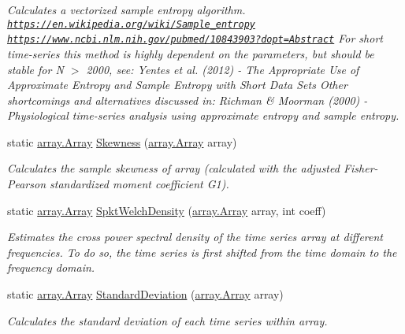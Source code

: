 \begin{DoxyCompactItemize}
\begin{DoxyCompactList}\small\item\em Calculates a vectorized sample entropy algorithm. \href{https://en.wikipedia.org/wiki/Sample_entropy}{\tt https\+://en.\+wikipedia.\+org/wiki/\+Sample\+\_\+entropy} \href{https://www.ncbi.nlm.nih.gov/pubmed/10843903?dopt=Abstract}{\tt https\+://www.\+ncbi.\+nlm.\+nih.\+gov/pubmed/10843903?dopt=\+Abstract} For short time-\/series this method is highly dependent on the parameters, but should be stable for N $>$ 2000, see\+: Yentes et al. (2012) -\/ The Appropriate Use of Approximate Entropy and Sample Entropy with Short Data Sets Other shortcomings and alternatives discussed in\+: Richman \& Moorman (2000) -\/ Physiological time-\/series analysis using approximate entropy and sample entropy. \end{DoxyCompactList}\item 
static \mbox{\hyperlink{classkhiva_1_1array_1_1_array}{array.\+Array}} \mbox{\hyperlink{classkhiva_1_1features_1_1_features_a31ad18b51c0f5016e87fbd4e6e61be4f}{Skewness}} (\mbox{\hyperlink{classkhiva_1_1array_1_1_array}{array.\+Array}} array)
\begin{DoxyCompactList}\small\item\em Calculates the sample skewness of array (calculated with the adjusted Fisher-\/\+Pearson standardized moment coefficient G1). \end{DoxyCompactList}\item 
static \mbox{\hyperlink{classkhiva_1_1array_1_1_array}{array.\+Array}} \mbox{\hyperlink{classkhiva_1_1features_1_1_features_a96814e8fb33d72bd2ba7cb552bcf4d02}{Spkt\+Welch\+Density}} (\mbox{\hyperlink{classkhiva_1_1array_1_1_array}{array.\+Array}} array, int coeff)
\begin{DoxyCompactList}\small\item\em Estimates the cross power spectral density of the time series array at different frequencies. To do so, the time series is first shifted from the time domain to the frequency domain. \end{DoxyCompactList}\item 
static \mbox{\hyperlink{classkhiva_1_1array_1_1_array}{array.\+Array}} \mbox{\hyperlink{classkhiva_1_1features_1_1_features_afcda5621d1ba777b856df4784245c562}{Standard\+Deviation}} (\mbox{\hyperlink{classkhiva_1_1array_1_1_array}{array.\+Array}} array)
\begin{DoxyCompactList}\small\item\em Calculates the standard deviation of each time series within array. \end{DoxyCompactList}\item 

\end{DoxyCompactItemize}
